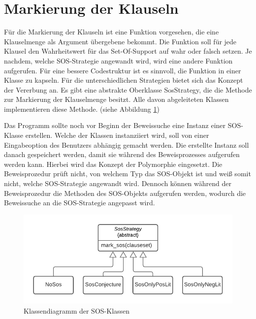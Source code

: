 \section{Markierung der Klauseln}
Für die Markierung der Klauseln ist eine Funktion vorgesehen, die eine Klauselmenge als Argument übergebene bekommt. Die Funktion soll für jede Klausel den Wahrheitswert für das Set-Of-Support auf wahr oder falsch setzen. Je nachdem, welche SOS-Strategie angewandt wird, wird eine andere Funktion aufgerufen. Für eine bessere Codestruktur ist es sinnvoll, die Funktion in einer Klasse zu kapseln. Für die unterschiedlichen Strategien bietet sich das Konzept der Vererbung an. Es gibt eine abstrakte Oberklasse SosStrategy, die die Methode zur Markierung der Klauselmenge besitzt. Alle davon abgeleiteten Klassen implementieren diese Methode. (siehe Abbildung \ref{fig:sosstrategy0})

Das Programm sollte noch vor Beginn der Beweissuche eine Instanz einer SOS-Klasse erstellen. Welche der Klassen instanziiert wird, soll von einer Eingabeoption des Benutzers abhängig gemacht werden. Die erstellte Instanz soll danach gespeichert werden, damit sie während des Beweisprozesses aufgerufen werden kann. Hierbei wird das Konzept der Polymorphie eingesetzt. Die Beweisprozedur prüft nicht, von welchem Typ das SOS-Objekt ist und weiß somit nicht, welche SOS-Strategie angewandt wird. Dennoch können während der Beweisprozedur die Methoden des SOS-Objekts aufgerufen werden, wodurch die Beweissuche an die SOS-Strategie angepasst wird.

\begin{figure}
	\centering
	\includegraphics[width=0.7\linewidth]{images/Lucid/SosStrategy0}
	\caption{Klassendiagramm der SOS-Klassen}
	\label{fig:sosstrategy0}
\end{figure}



